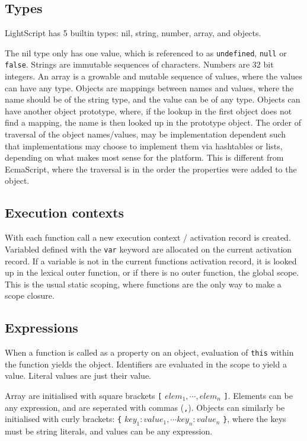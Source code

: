 \documentclass[11pt]{report}
\begin{document}
\subsection{Types}
LightScript has 5 builtin types: nil, string, number, array, and objects.

The nil type only has one value, which is referenced to as \verb|undefined|, \verb|null| or \verb|false|. 
Strings are immutable sequences of characters.
Numbers are 32 bit integers.
An array is a growable and mutable sequence of values, where the values can have any type.
Objects are mappings between names and values, where the name should be of the string type, and the value can be of any type. Objects can have another object prototype, where, if the lookup in the first object does not find a mapping, the name is then looked up in the prototype object.
The order of traversal of the object names/values, may be implementation dependent such that implementations may choose to implement them via hashtables or lists, depending on what makes most sense for the platform. This is different from EcmaScript, where the traversal is in the order the properties were added to the object.

\subsection{Execution contexts}

With each function call a new execution context / activation record is created. 
Variabled defined with the \verb|var| keyword are allocated on the current activation record. 
If a variable is not in the current functions activation record,
it is looked up in the lexical outer function, or if there is no outer function, the global scope.
This is the usual static scoping, where functions are the only way to make a scope closure.

\subsection{Expressions}

When a function is called as a property on an object, evaluation of \verb|this| within the function yields the object.  Identifiers are evaluated in the scope to yield a value. Literal values are just their value.

Array are initialised with square brackets \verb|[| $elem_1,\cdots,elem_n$ \verb|]|. Elements can be any expression, and are seperated with commas (\verb|,|). 
Objects can similarly be initialised with curly brackets: \verb|{| 
$key_1: value_1, \cdots key_n: value_n$ \verb|}|, where the keys must be string literals, and values can be any expression.
\end{document}
